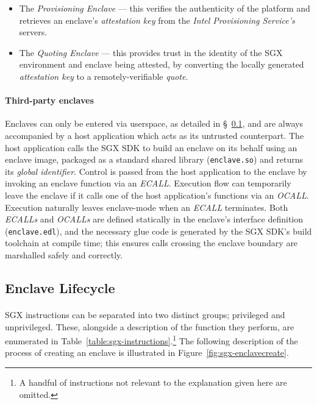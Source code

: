 \begin{itemize}
    \item The \textit{Provisioning Enclave} --- this verifies the authenticity of the platform and retrieves an enclave's \textit{attestation key} from the \textit{Intel Provisioning Service's} servers.
    \item The \textit{Quoting Enclave} --- this provides trust in the identity of the SGX environment and enclave being attested, by converting the locally generated \textit{attestation key} to a remotely-verifiable \textit{quote}.
\end{itemize}

\paragraph{Third-party enclaves} Enclaves can only be entered via userspace, as detailed in §~\ref{sec:sgx-lifecycle}, and are always accompanied by a host application which acts as its untrusted counterpart. The host application calls the SGX SDK to build an enclave on its behalf using an enclave image, packaged as a standard shared library (\texttt{enclave.so}) and returns its \textit{global identifier}. Control is passed from the host application to the enclave by invoking an enclave function via an \textit{ECALL}. Execution flow can temporarily leave the enclave if it calls one of the host application's functions via an \textit{OCALL}. Execution naturally leaves enclave-mode when an \textit{ECALL} terminates. Both \textit{ECALLs} and \textit{OCALLs} are defined statically in the enclave's interface definition (\texttt{enclave.edl}), and the necessary glue code is generated by the SGX SDK's build toolchain at compile time; this ensures calls crossing the enclave boundary are marshalled safely and correctly.


\subsection{Enclave Lifecycle}
\label{sec:sgx-lifecycle}

\paragraph{} SGX instructions can be separated into two distinct groups; privileged and unprivileged. These, alongside a description of the function they perform, are enumerated in Table~\ref{table:sgx-instructions}.\footnote{A handful of instructions not relevant to the explanation given here are omitted.} The following description of the process of creating an enclave is illustrated in Figure~\ref{fig:sgx-enclavecreate}.

